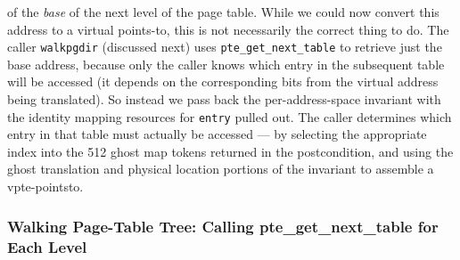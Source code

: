 of the \emph{base} of the next level of the page table.
While we could now convert this address to a virtual points-to, this is not necessarily the correct thing to do.
The caller \lstinline|walkpgdir| (discussed next) uses \lstinline|pte_get_next_table| to retrieve just the base address,
because only the caller knows which entry in the subsequent table will be accessed (it depends on the corresponding bits from the virtual
address being translated). So instead we pass back the per-address-space invariant with the identity mapping resources for \lstinline|entry|
pulled out. The caller determines which entry in that table must actually
be accessed --- by selecting the appropriate index into the 512 ghost map tokens returned in the postcondition,
and using the ghost translation and physical location portions of the invariant to assemble a vpte-pointsto.



\subsubsection{Walking Page-Table Tree: Calling \textsf{pte\_get\_next\_table} for Each Level}
\label{wlkpgdir}

